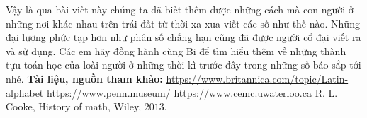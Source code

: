 	\vskip 0.1cm
	Vậy là qua bài viết này chúng ta đã biết thêm được những cách mà con người ở những nơi khác nhau trên trái đất từ thời xa xưa viết các số như thế nào. Những đại lượng phức tạp hơn như phân số chẳng hạn cũng đã được người cổ đại viết ra và sử dụng. Các em hãy đồng hành cùng Bi để tìm hiểu thêm về những thành tựu toán học của loài người ở những thời kì trước đây trong những số báo sắp tới nhé. 
	\vskip 0.1cm
	\textbf{Tài liệu, nguồn tham khảo:}
	\vskip 0.1cm
	\url{https://www.britannica.com/topic/Latin-alphabet}
	\vskip 0.1cm
	\url{https://www.penn.museum/}
	\vskip 0.1cm
	\url{https://www.cemc.uwaterloo.ca}
	\vskip 0.1cm
	R. L. Cooke, History of math, Wiley, $2013$.